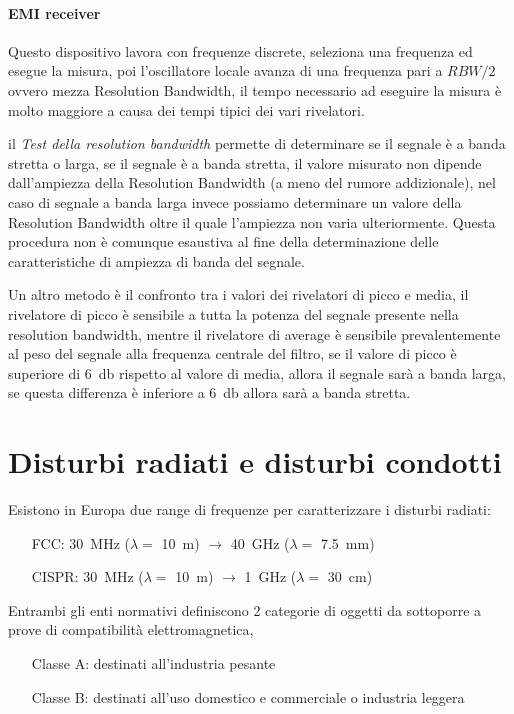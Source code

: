 
\paragraph{EMI receiver}

Questo dispositivo lavora con frequenze discrete, seleziona
una frequenza ed esegue la misura, poi l'oscillatore locale
avanza di una frequenza pari a $RBW/2$ ovvero mezza Resolution Bandwidth,
il tempo necessario ad eseguire la misura è molto maggiore a causa dei tempi
tipici dei vari rivelatori.

il \textit{Test della resolution bandwidth} permette di determinare
se il segnale è a banda stretta o larga, se il segnale è a banda stretta, il valore
misurato non dipende dall'ampiezza della Resolution Bandwidth (a meno del rumore addizionale),
nel caso di segnale a banda larga invece possiamo determinare un valore della Resolution Bandwidth oltre
il quale l'ampiezza non varia ulteriormente.
Questa procedura non è comunque esaustiva al fine della determinazione delle caratteristiche di 
ampiezza di banda del segnale.

Un altro metodo è il confronto tra i valori dei rivelatori di picco e media,
il rivelatore di picco è sensibile a tutta la potenza del segnale presente nella
resolution bandwidth, mentre il rivelatore di average è sensibile prevalentemente al peso
del segnale alla frequenza centrale del filtro, se il valore di picco è superiore di \SI{6}{\decibel}
rispetto al valore di media, allora il segnale sarà a banda larga, se questa differenza
è inferiore a \SI{6}{\decibel} allora sarà a banda stretta.

\section{Disturbi radiati e disturbi condotti}
Esistono in Europa due range di frequenze per caratterizzare i disturbi radiati:
\begin{itemize}
 \item [FCC:] \SI{30}{\mega\hertz} ($\lambda = $ \SI{10}{\meter}) $\rightarrow$ \SI{40}{\giga\hertz} ($\lambda = $ \SI{7,5}{\milli\meter})
 \item [CISPR:] \SI{30}{\mega\hertz} ($\lambda = $ \SI{10}{\meter}) $\rightarrow$ \SI{1}{\giga\hertz} ($\lambda =$ \SI{30}{\centi\meter})
\end{itemize}

Entrambi gli enti normativi definiscono 2 categorie di oggetti da sottoporre a prove di compatibilità elettromagnetica,
\begin{itemize}
 \item [Classe A:] destinati all'industria pesante
 \item [Classe B:] destinati all'uso domestico e commerciale o industria leggera
\end{itemize}


